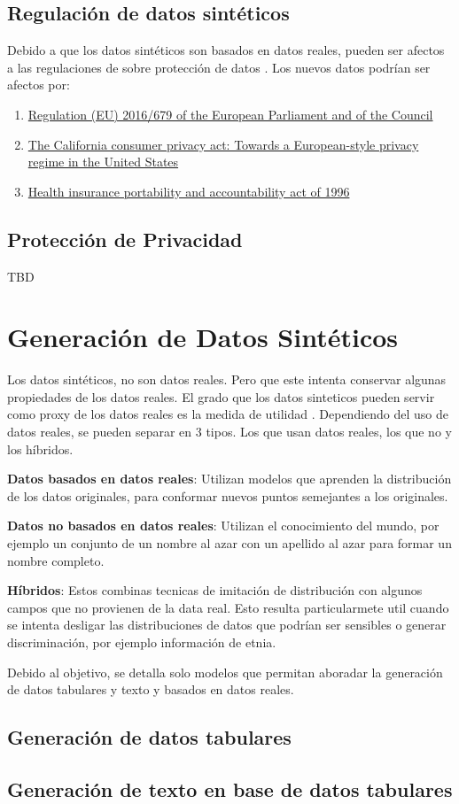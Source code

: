 \subsection{Regulación de datos sintéticos}
Debido a que los datos sintéticos son basados en datos reales, pueden ser afectos a las regulaciones de sobre protección de datos \cite{bruce_practical_2020}. Los nuevos datos podrían ser afectos por:
\begin{enumerate}
    \item \href{https://dvbi.ru/Portals/0/DOCUMENTS_SHARE/RISK_MANAGEMENT/EBA/GDPR_eng_rus.pdf}{Regulation (EU) 2016/679 of the European Parliament and of the Council} \cite{regulation_regulation_2016}
    \item \href{https://heinonline.org/HOL/LandingPage?handle=hein.journals/jtlp23&div=5&id=&page=}{The California consumer privacy act: Towards a European-style privacy regime in the United States} \cite{pardau_california_2018}
    \item \href{http://www.eolusinc.com/pdf/hipaa.pdf}{Health insurance portability and accountability act of 1996} \cite{act_health_1996}
\end{enumerate}

\subsection{Protección de Privacidad}
TBD

\section{Generación de Datos Sintéticos}

Los datos sintéticos, no son datos reales. Pero que este intenta conservar algunas propiedades de los datos reales. El grado que los datos sinteticos pueden servir como proxy de los datos reales es la medida de utilidad \cite{bruce_practical_2020}.
Dependiendo del uso de datos reales, se pueden separar en 3 tipos. Los que usan datos reales, los que no y los híbridos.

\textbf{Datos basados en datos reales}: Utilizan modelos que aprenden la distribución de los datos originales, para conformar nuevos puntos semejantes a los originales.

\textbf{Datos no basados en datos reales}: Utilizan el conocimiento del mundo, por ejemplo un conjunto de un nombre al azar con un apellido al azar para formar un nombre completo.

\textbf{Híbridos}: Estos combinas tecnicas de imitación de distribución con algunos campos que no provienen de la data real. Esto resulta particularmete util cuando se intenta desligar las distribuciones de datos que podrían ser sensibles o generar discriminación, por ejemplo información de etnia.

Debido al objetivo, se detalla solo modelos que permitan aboradar la generación de datos tabulares y texto y basados en datos reales.

\subsection{Generación de datos tabulares}

\subsection{Generación de texto en base de datos tabulares}
